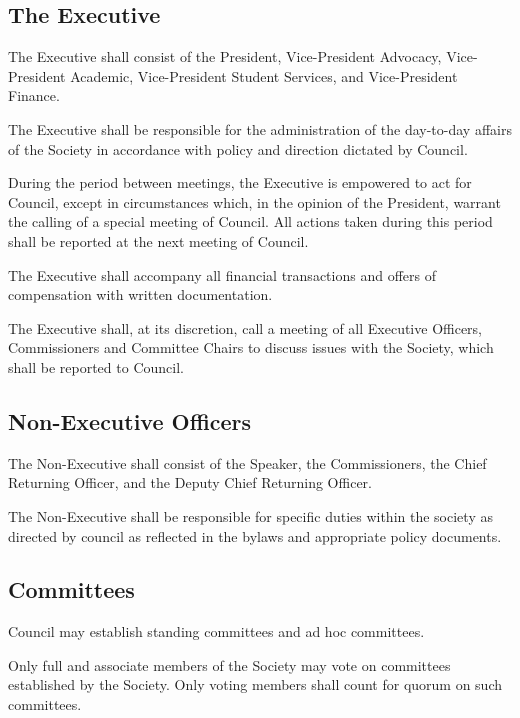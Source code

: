 \subsection{The Executive}
	\begin{longenum}[label*=\thesubsection.\arabic*., align=left]
	\item The Executive shall consist of the President, Vice-President Advocacy, Vice-President Academic, Vice-President Student Services, and Vice-President Finance. 
    \item The Executive shall be responsible for the administration of the day-to-day affairs of the Society in accordance with policy and direction dictated by Council.
    \item During the period between meetings, the Executive is empowered to act for Council, except in circumstances which, in the opinion of the President, warrant the calling of a special meeting of Council. All actions taken during this period shall be reported at the next meeting of Council.
    \item The Executive shall accompany all financial transactions and offers of compensation with written documentation. 
    \item The Executive shall, at its discretion, call a meeting of all Executive Officers, Commissioners and Committee Chairs to discuss issues with the Society, which shall be reported to Council. 

 
\end{longenum}
\subsection{Non-Executive Officers}
	\begin{longenum}[label*=\thesubsection.\arabic*., align=left]
	\item The Non-Executive shall consist of the Speaker, the Commissioners, the Chief Returning Officer, and the Deputy Chief Returning Officer. 
    \item The Non-Executive shall be responsible for specific duties within the society as directed by council as reflected in the bylaws and appropriate policy documents.
\end{longenum}
\subsection{Committees}
	\begin{longenum}[label*=\thesubsection.\arabic*., align=left]
	\item Council may establish standing committees and ad hoc committees.
    \item Only full and associate members of the Society may vote on committees established by the Society. Only voting members shall count for quorum on such committees.
\end{longenum}

